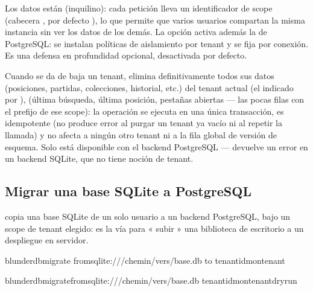 \documentclass[letterpaper,10pt,spanish]{sphinxmanual}
\begin{document}
\sphinxAtStartPar
Los datos están  (inquilino): cada petición lleva un identificador de scope (cabecera , por defecto ), lo que permite que varios usuarios compartan la misma instancia sin ver los datos de los demás. La opción  activa además la  de PostgreSQL: se instalan políticas de aislamiento por tenant y  se fija por conexión. Es una defensa en profundidad opcional, desactivada por defecto.

\sphinxAtStartPar
Cuando se da de baja un tenant,  elimina definitivamente todos sus datos (posiciones, partidas, colecciones, historial, etc.) del tenant actual (el indicado por ),  (última búsqueda, última posición, pestañas abiertas — las pocas filas  con el prefijo de ese scope): la operación se ejecuta en una única transacción, es idempotente (no produce error al purgar un tenant ya vacío ni al repetir la llamada) y no afecta a ningún otro tenant ni a la fila global de versión de esquema. Solo está disponible con el backend PostgreSQL — devuelve un error  en un backend SQLite, que no tiene noción de tenant.


\subsection{Migrar una base SQLite a PostgreSQL}
\label{\detokenize{mode_headless:migrer-une-base-sqlite-vers-postgresql}}\label{\detokenize{mode_headless:headless-migrate}}
\sphinxAtStartPar
{} copia una base SQLite de un solo usuario a un backend PostgreSQL, bajo un scope de tenant elegido: es la vía para « subir » una biblioteca de escritorio a un despliegue en servidor.

\begin{sphinxVerbatim}[commandchars=\\\{\}]
blunderdbmigrate
\PYGZhy{}\PYGZhy{}fromsqlite:///chemin/vers/base.db
\PYGZhy{}\PYGZhy{}to
\PYGZhy{}\PYGZhy{}tenant\PYGZhy{}idmon\PYGZhy{}tenant

blunderdbmigrate\PYGZhy{}\PYGZhy{}fromsqlite:///chemin/vers/base.db
\PYGZhy{}\PYGZhy{}tenant\PYGZhy{}idmon\PYGZhy{}tenant\PYGZhy{}\PYGZhy{}dry\PYGZhy{}run
\end{sphinxVerbatim}
\end{document}
